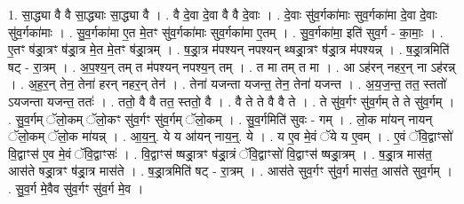 \documentclass[17pt]{extarticle}
\begin{document}
1. सा॒द्ध्या वै वै सा॒द्ध्याः सा॒द्ध्या वै । . वै दे॒वा दे॒वा वै वै दे॒वाः । . दे॒वाः सु॑व॒र्गका॑माः सुव॒र्गका॑मा दे॒वा दे॒वाः सु॑व॒र्गका॑माः । . सु॒व॒र्गका॑मा ए॒त मे॒तꣳ सु॑व॒र्गका॑माः सुव॒र्गका॑मा ए॒तम् । . सु॒व॒र्गका॑मा॒ इति॑ सुव॒र्ग - का॒माः॒ । . ए॒तꣳ ष॑ड्रा॒त्रꣳ ष॑ड्रा॒त्र मे॒त मे॒तꣳ ष॑ड्रा॒त्रम् । . ष॒ड्रा॒त्र म॑पश्यन् नपश्यन् थ्षड्रा॒त्रꣳ ष॑ड्रा॒त्र म॑पश्यन्न् । . ष॒ड्रा॒त्रमिति॑ षट् - रा॒त्रम् । . अ॒प॒श्य॒न् तम् त म॑पश्यन् नपश्य॒न् तम् । . त मा तम् त मा । . आ ऽह॑रन् नहर॒न् ना ऽह॑रन्न् । . अ॒ह॒र॒न् तेन॒ तेना॑ हरन् नहर॒न् तेन॑ । . तेना॑ यजन्ता यजन्त॒ तेन॒ तेना॑ यजन्त । . अ॒य॒ज॒न्त॒ तत॒ स्ततो॑ ऽयजन्ता यजन्त॒ ततः॑ । . ततो॒ वै वै तत॒ स्ततो॒ वै । . वै ते ते वै वै ते । . ते सु॑व॒र्गꣳ सु॑व॒र्गम् ते ते सु॑व॒र्गम् । . सु॒व॒र्गम् ॅलो॒कम् ॅलो॒कꣳ सु॑व॒र्गꣳ सु॑व॒र्गम् ॅलो॒कम् । . सु॒व॒र्गमिति॑ सुवः - गम् । . लो॒क मा॑यन् नायन् ॅलो॒कम् ॅलो॒क मा॑यन्न् । . आ॒य॒न्॒. ये य आ॑यन् नाय॒न्॒. ये । . य ए॒व मे॒वं ॅये य ए॒वम् । . ए॒वं ॅवि॒द्वाꣳसो॑ वि॒द्वाꣳस॑ ए॒व मे॒वं ॅवि॒द्वाꣳसः॑ । . वि॒द्वाꣳस॑ ष्षड्रा॒त्रꣳ ष॑ड्रा॒त्रं ॅवि॒द्वाꣳसो॑ वि॒द्वाꣳस॑ ष्षड्रा॒त्रम् । . ष॒ड्रा॒त्र मास॑त॒ आस॑ते षड्रा॒त्रꣳ ष॑ड्रा॒त्र मास॑ते । . ष॒ड्रा॒त्रमिति॑ षट् - रा॒त्रम् । . आस॑ते सुव॒र्गꣳ सु॑व॒र्ग मास॑त॒ आस॑ते सुव॒र्गम् । . सु॒व॒र्ग मे॒वैव सु॑व॒र्गꣳ सु॑व॒र्ग मे॒व । \newline
\end{document}
